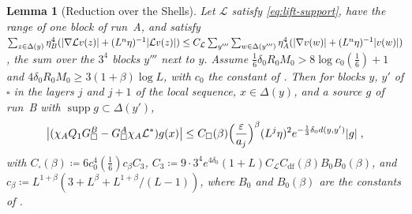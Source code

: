 \documentclass[11pt]{preprint}
\DeclarePairedDelimiter{\abs}{\lvert}{\rvert}
\numberwithin{equation}{section}
\newtheorem{lemma}[theorem]{Lemma}
\theoremstyle{definition}
\theoremstyle{remark}
\theoremstyle{plain}
\begin{document}
\begin{lemma}[Reduction over the Shells]\label{lem:shell-reduction}
Let $\mathcal L$ satisfy \eqref{eq:lift-support}, have the range of one block of run~A, and satisfy $\sum_{z \in \Delta(y)}\eta_B^4(\abs{\nabla\mathcal Lv(z)} + (L^n\eta)^{-1}\abs{\mathcal Lv(z)}) \leq C_{\mathcal L}\sum_{y'''}\sum_{w \in \Delta(y''')}\eta_A^4(\abs{\nabla v(w)} + (L^n\eta)^{-1}\abs{v(w)})$, the sum over the $3^4$ blocks $y'''$ next to $y$. Assume $\frac16\delta_0R_0M_0 > 8\log c_0(\frac16) + 1$ and $4\delta_0R_0M_0 \geq 3(1 + \beta)\log L$, with $c_0$ the constant of \cite[(2.58)]{BalabanPRT2}. Then for blocks $y$, $y'$ of $\square$ in the layers $j$ and $j + 1$ of the local sequence, $x \in \Delta(y)$, and a source $g$ of run~B with $\operatorname{supp}g \subset \Delta(y')$,
\begin{equation}\label{eq:shell-reduction}
    \bigl\lvert(\chi_AQ_1G^B_\square - G^A_\square\chi_A\mathcal L^*)g(x)\bigr\rvert \leq C_\square(\beta)\Bigl(\frac{\varepsilon}{a_j}\Bigr)^\beta(L^j\eta)^2e^{-\frac13\delta_0d(y, y')}\abs{g}\;,
\end{equation}
with $C_\square(\beta) \coloneqq 6c_0^4(\frac16)c_\beta C_3$, $C_3 \coloneqq 9\cdot3^4e^{4\delta_0}(1 + L)C_{\mathcal L}C_{\mathrm{df}}(\beta)B_0B_0(\beta)$, and $c_\beta \coloneqq L^{1+\beta}(3 + L^\beta + L^{1+\beta}/(L - 1))$, where $B_0$ and $B_0(\beta)$ are the constants of \cite[(3.42), (3.43)]{BalabanPBG}.
\end{lemma}
\end{document}

